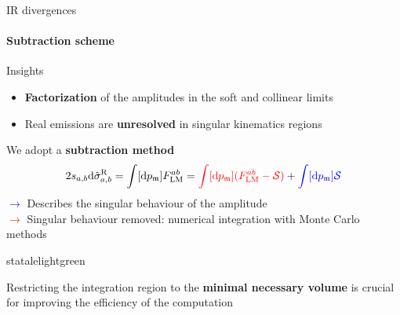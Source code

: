 
\begin{frame} {IR divergences}
 \framesubtitle{Subtraction scheme}
Insights \\
\begin{itemize}
    \item \textbf{Factorization} of the amplitudes in the soft and collinear limits 
    \item Real emissions are \textbf{unresolved} in singular kinematics regions
\end{itemize}
 \vspace{1.em}
 We adopt a \textbf{subtraction method}
\begin{equation*}
    2s_{a,b} \mathrm{d} \hat{\sigma}_{a,b}^{\mathrm{R}} = \int [\mathrm{d}p_{\mathfrak{m}}] F^{ab}_{\mathrm{LM}} =  \textcolor{red}{\int [\mathrm{d}p_{\mathfrak{m}}] (F^{ab}_{\mathrm{LM}} - \mathcal{S})}  + \textcolor{blue}{\int [\mathrm{d}p_{\mathfrak{m}}] \mathcal{S}}
    \label{subtraction-flm}
\end{equation*}
\textcolor{blue}{$\to$} Describes the singular behaviour of the amplitude\\ 
\textcolor{red}{$\to$} Singular behaviour removed: numerical integration with Monte Carlo methods \\


\begin{colorblock}[black]{statalelightgreen}{}
\begin{center}
    Restricting the integration region to the \textbf{minimal necessary volume} is crucial for improving the efficiency of the computation
\end{center}
            
      \end{colorblock}


\end{frame}


